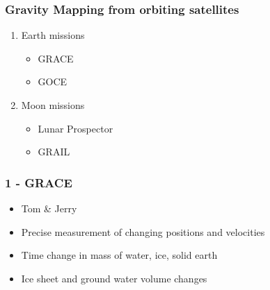 \documentclass[aspectratio=169]{beamer}
\begin{document}

\begin{frame}
  \frametitle{Gravity Mapping from orbiting satellites}
\begin{center}
\begin{enumerate}
 \item Earth missions
	\begin{itemize}
	\item GRACE
	\item GOCE
	\end{itemize}
 \item Moon missions
	\begin{itemize}
	\item Lunar Prospector
	\item GRAIL
	\end{itemize}
\end{enumerate}
\end{center}
\end{frame}


{
\begin{frame}[plain]
\end{frame}}


\begin{frame}
  \frametitle{1 - GRACE}
\begin{center}
\begin{itemize}
 \item Tom \& Jerry
 \item Precise measurement of changing positions and velocities
 \item Time change in mass of water, ice, solid earth 
 \item Ice sheet and ground water volume changes 
\end{itemize}
\end{center}
\end{frame}
\end{document}
